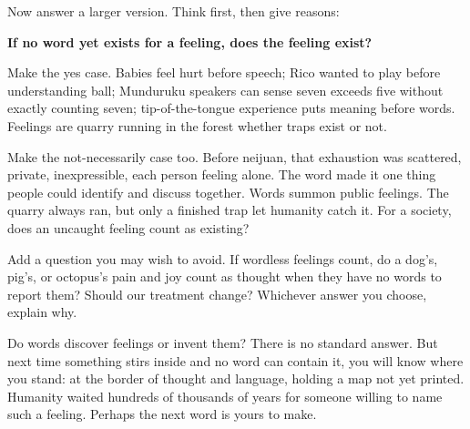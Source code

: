 Now answer a larger version. Think first, then give reasons:

\textbf{If no word yet exists for a feeling, does the feeling exist?}

Make the yes case. Babies feel hurt before speech; Rico wanted to play before understanding ball; Munduruku speakers can sense seven exceeds five without exactly counting seven; tip-of-the-tongue experience puts meaning before words. Feelings are quarry running in the forest whether traps exist or not.

Make the not-necessarily case too. Before neijuan, that exhaustion was scattered, private, inexpressible, each person feeling alone. The word made it one thing people could identify and discuss together. Words summon public feelings. The quarry always ran, but only a finished trap let humanity catch it. For a society, does an uncaught feeling count as existing?

Add a question you may wish to avoid. If wordless feelings count, do a dog's, pig's, or octopus's pain and joy count as thought when they have no words to report them? Should our treatment change? Whichever answer you choose, explain why.

Do words discover feelings or invent them? There is no standard answer. But next time something stirs inside and no word can contain it, you will know where you stand: at the border of thought and language, holding a map not yet printed. Humanity waited hundreds of thousands of years for someone willing to name such a feeling. Perhaps the next word is yours to make.
